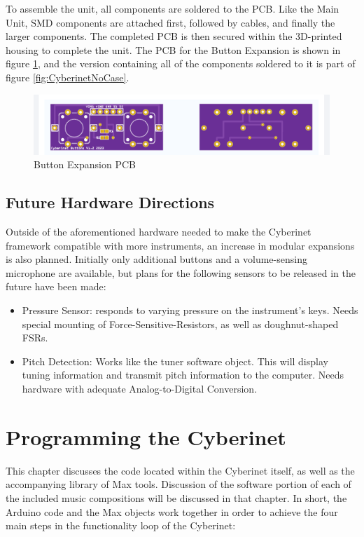 To assemble the unit, all components are soldered to the PCB. Like the Main Unit, SMD components are attached first, followed by cables, and finally the larger components. The completed PCB is then secured within the 3D-printed housing to complete the unit. The PCB for the Button Expansion is shown in figure \ref{fig:buttonPCB}, and the version containing all of the components soldered to it is part of figure \ref{fig:CyberinetNoCase}.


\begin{center}
    \begin{figure}
        \centering
        \includegraphics[scale=0.5]{diagrams/PCBs/buttons1.2.png}
        \caption{Button Expansion PCB}
        \label{fig:buttonPCB}
    \end{figure}
\end{center}


\section{Future Hardware Directions}
Outside of the aforementioned hardware needed to make the Cyberinet framework compatible with more instruments, an increase in modular expansions is also planned. Initially only additional buttons and a volume-sensing microphone are available, but plans for the following sensors to be released in the future have been made:

\begin{itemize}
    \item Pressure Sensor: responds to varying pressure on the instrument's keys. Needs special mounting of Force-Sensitive-Resistors, as well as doughnut-shaped FSRs.
    \item Pitch Detection: Works like the tuner software object. This will display tuning information and transmit pitch information to the computer. Needs hardware with adequate Analog-to-Digital Conversion.
\end{itemize}





\chapter{Programming the Cyberinet}
This chapter discusses the code located within the Cyberinet itself, as well as the accompanying library of Max tools. Discussion of the software portion of each of the included music compositions will be discussed in that chapter. In short, the Arduino code and the Max objects work together in order to achieve the four main steps in the functionality loop of the Cyberinet:

